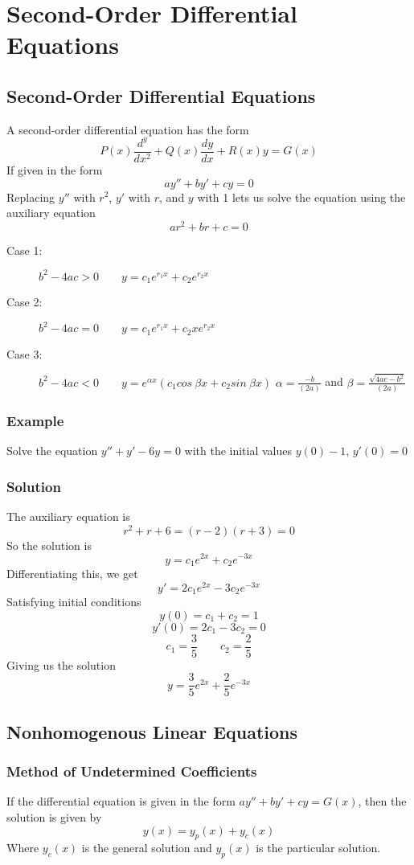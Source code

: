 \chapter{Second-Order Differential Equations}

\section{Second-Order Differential Equations}
A second-order differential equation has the form
$$P(x)\frac{d^y}{dx^2}+Q(x)\frac{dy}{dx}+R(x)y=G(x)$$
If given in the form
$$ay''+by'+cy=0$$
Replacing $y''$ with $r^2$, $y'$ with $r$, and $y$ with 1 lets us solve the
equation using the auxiliary equation
$$ar^2+br+c=0$$
\begin{description}
    \item [Case 1:] $b^2-4ac>0 \qquad y=c_1e^{r_1x}+c_2e^{r_2x}$
    \item [Case 2:] $b^2-4ac=0 \qquad y=c_1e^{r_1x}+c_2xe^{r_2x}$
    \item [Case 3:] $b^2-4ac<0 \qquad y=e^{\alpha x}(c_1cos\:\beta x+c_2sin\: \beta x)$
          \subitem $\alpha = \frac{-b}{(2a)}$ and $\beta = \frac{\sqrt{4ac-b^2}}{(2a)}$
\end{description}

\subsection*{Example}
Solve the equation $y''+y'-6y=0$ with the initial values $y(0)-1$, $y'(0)=0$

\subsection*{Solution}
The auxiliary equation is
$$r^2+r+6=(r-2)(r+3)=0$$
So the solution is
$$y=c_1e^{2x}+c_2e^{-3x}$$
Differentiating this, we get
$$y'=2c_1e^{2x}-3c_2e^{-3x}$$
Satisfying initial conditions
$$y(0)=c_1+c_2=1$$
$$y'(0)=2c_1-3c_2=0$$
$$c_1=\frac{3}{5} \qquad c_2=\frac{2}{5}$$
Giving us the solution
$$y=\frac{3}{5}e^{2x}+\frac{2}{5}e^{-3x}$$

\section{Nonhomogenous Linear Equations}

\subsection*{Method of Undetermined Coefficients}
If the differential equation is given in the form $ay''+by'+cy=G(x)$, then the solution
is given by
$$y(x)=y_p(x)+y_c(x)$$
Where $y_c(x)$ is the general solution and $y_p(x)$ is the particular solution.

